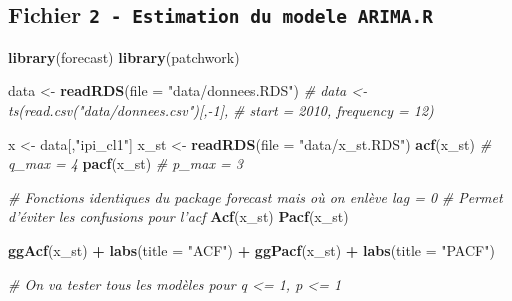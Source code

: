 \documentclass[french]{article}
\newenvironment{Shaded}{\begin{snugshade}}{\end{snugshade}}
\newcommand{\CommentTok}[1]{\textcolor[rgb]{0.56,0.35,0.01}{\textit{#1}}}
\newcommand{\DataTypeTok}[1]{\textcolor[rgb]{0.13,0.29,0.53}{#1}}
\newcommand{\KeywordTok}[1]{\textcolor[rgb]{0.13,0.29,0.53}{\textbf{#1}}}
\newcommand{\NormalTok}[1]{#1}
\newcommand{\OperatorTok}[1]{\textcolor[rgb]{0.81,0.36,0.00}{\textbf{#1}}}
\newcommand{\StringTok}[1]{\textcolor[rgb]{0.31,0.60,0.02}{#1}}
\begin{document}
\hypertarget{fichier-2---estimation-du-modele-arima.r}{%
\subsection{\texorpdfstring{Fichier \texttt{2\ -\ Estimation\ du\ modele\ ARIMA.R}}{Fichier 2 - Estimation du modele ARIMA.R}}\label{fichier-2---estimation-du-modele-arima.r}}

\begin{Shaded}
\begin{Highlighting}[]
\KeywordTok{library}\NormalTok{(forecast)}
\KeywordTok{library}\NormalTok{(patchwork)}

\NormalTok{data <-}\StringTok{ }\KeywordTok{readRDS}\NormalTok{(}\DataTypeTok{file =} \StringTok{"data/donnees.RDS"}\NormalTok{)}
\CommentTok{# data <- ts(read.csv("data/donnees.csv")[,-1],}
\CommentTok{#          start = 2010, frequency = 12)}

\NormalTok{x <-}\StringTok{ }\NormalTok{data[,}\StringTok{"ipi_cl1"}\NormalTok{]}
\NormalTok{x_st <-}\StringTok{ }\KeywordTok{readRDS}\NormalTok{(}\DataTypeTok{file =} \StringTok{"data/x_st.RDS"}\NormalTok{)}
\KeywordTok{acf}\NormalTok{(x_st) }\CommentTok{# q_max = 4}
\KeywordTok{pacf}\NormalTok{(x_st) }\CommentTok{# p_max = 3}

\CommentTok{# Fonctions identiques du package forecast mais où on enlève lag = 0}
\CommentTok{# Permet d'éviter les confusions pour l'acf}
\KeywordTok{Acf}\NormalTok{(x_st)}
\KeywordTok{Pacf}\NormalTok{(x_st)}

\KeywordTok{ggAcf}\NormalTok{(x_st) }\OperatorTok{+}\StringTok{ }\KeywordTok{labs}\NormalTok{(}\DataTypeTok{title =} \StringTok{"ACF"}\NormalTok{) }\OperatorTok{+}
\StringTok{    }\KeywordTok{ggPacf}\NormalTok{(x_st) }\OperatorTok{+}\StringTok{ }\KeywordTok{labs}\NormalTok{(}\DataTypeTok{title =} \StringTok{"PACF"}\NormalTok{)}

\CommentTok{# On va tester tous les modèles pour q <= 1, p <= 1}


\end{Highlighting}
\end{Shaded}
\end{document}
